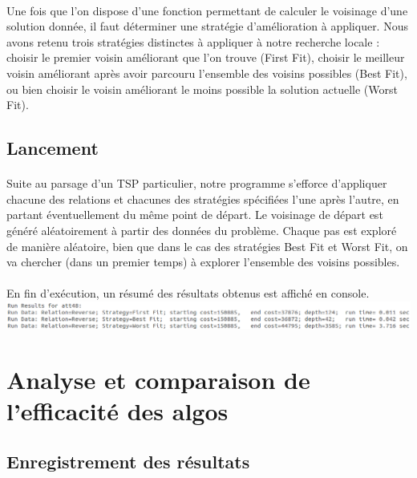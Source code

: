 \documentclass[a4paper,10pt]{report}
\begin{document}
\paragraph{}
  Une fois que l'on dispose d'une fonction permettant de calculer le voisinage d'une solution donnée, il faut déterminer
une stratégie d'amélioration à appliquer. Nous avons retenu trois stratégies distinctes à appliquer à notre recherche
locale : choisir le premier voisin améliorant que l'on trouve (First Fit), choisir le meilleur voisin améliorant après
avoir parcouru l'ensemble des voisins possibles (Best Fit), ou bien choisir le voisin améliorant le moins possible la
solution actuelle (Worst Fit).


\subsection{Lancement}

\paragraph{}
  Suite au parsage d'un TSP particulier, notre programme s'efforce d'appliquer chacune des relations et chacunes
des stratégies spécifiées l'une après l'autre, en partant éventuellement du même point de départ. Le voisinage de
départ est généré aléatoirement à partir des données du problème. Chaque pas est exploré de manière aléatoire, bien
que dans le cas des stratégies Best Fit et Worst Fit, on va chercher (dans un premier temps) à explorer l'ensemble
des voisins possibles.

\paragraph{}
En fin d'exécution, un résumé des résultats obtenus est affiché en console.
\includegraphics[width=\textwidth]{images/exec-summary.png} 

\section{Analyse et comparaison de l'efficacité des algos}
\subsection{Enregistrement des résultats}
\end{document}
